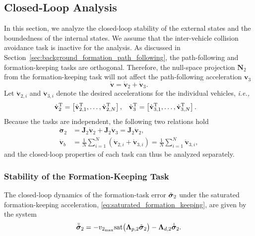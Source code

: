\subsection{Closed-Loop Analysis}\label{sec:closed_loop}
In this section, we analyze the closed-loop stability of the external states and the boundedness of the internal states. We assume that the inter-vehicle collision avoidance task is inactive for the analysis. As discussed in Section~\ref{sec:background_formation_path_following}, the path-following and formation-keeping tasks are orthogonal. Therefore, the null-space projection $\mathbf{N}_2$ from the formation-keeping task will not affect the path-following acceleration $\mathbf{v}_3$
\begin{equation}\label{eq:commanded_acceleration_inactive_colav}
    \dot{\mathbf{v}} = \dot{\mathbf{v}}_2 + \dot{\mathbf{v}}_3.
\end{equation}
Let $\dot{\mathbf{v}}_{2,i}$ and $\dot{\mathbf{v}}_{3,i}$ denote the desired accelerations for the individual vehicles, \emph{i.e.,}
\begin{align}
    \dot{\mathbf{v}}_{2}^{\mathrm{T}} &= \left[\dot{\mathbf{v}}_{2,1}^{\mathrm{T}}, \ldots, \dot{\mathbf{v}}_{2,N}^{\mathrm{T}}\right], &
    \dot{\mathbf{v}}_{3}^{\mathrm{T}} &= \left[\dot{\mathbf{v}}_{3,1}^{\mathrm{T}}, \ldots, \dot{\mathbf{v}}_{3,N}^{\mathrm{T}}\right].
\end{align}
Because the tasks are independent, the following two relations hold
\begin{align}
    \ddot{\bm{\sigma}}_2 &= \mathbf{J}_2\dot{\mathbf{v}}_2 + \mathbf{J}_2\dot{\mathbf{v}}_3 = \mathbf{J}_2\dot{\mathbf{v}}_2,\\
    \dot{\mathbf{v}}_b &= \frac{1}{N}\sum_{i=1}^N (\dot{\mathbf{v}}_{2,i} + \dot{\mathbf{v}}_{3,i}) = \frac{1}{N}\sum_{i=1}^N \dot{\mathbf{v}}_{3,i},
\end{align}
and the closed-loop properties of each task can thus be analyzed separately.


\subsubsection{Stability of the Formation-Keeping Task}
The closed-loop dynamics of the formation-task error $\Tilde{\bm{\sigma}}_2$ under the saturated formation-keeping acceleration, \eqref{eq:saturated_formation_keeping}, are given by the system
\begin{equation}\label{eq:task_2_dynamics}
    \ddot{\Tilde{\bm{\sigma}}}_2 = - v_{2_{\max}}\mathrm{sat}\bigl(\mathbf{\Lambda}_{p,2}\Tilde{\bm{\sigma}}_2\bigr) - \mathbf{\Lambda}_{d,2} \dot{\Tilde{\bm{\sigma}}}_2.
\end{equation}

